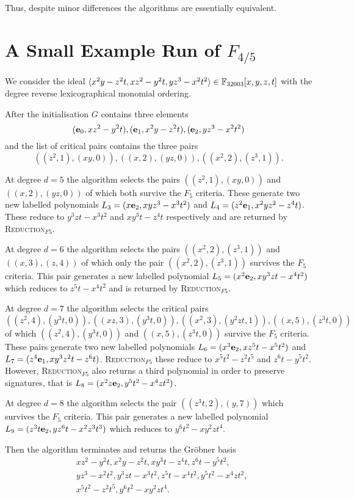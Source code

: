 Thus, despite minor differences the algorithms are essentially equivalent.

\section{A Small Example Run of \texorpdfstring{$F_{4/5}$}{F45}}

We consider the ideal $\langle {x^{2} y - z^{2} t, x z^{2} - y^{2} t, y z^{3} - x^{2} t^{2}} \rangle \in \mathbb{F}_{32003}[x, y, z, t]$ with the degree reverse lexicographical monomial ordering.

After the initialisation $G$ contains three elements $$(\mathbf{e}_0, xz^2 - y^2t), (\mathbf{e}_1, x^2y - z^2t),(\mathbf{e}_2, yz^3 - x^2t^2)$$ and the list of critical pairs contains the three pairs $$((z^2, 1), (xy, 0)), ((x, 2), (yz, 0)), ((x^2, 2), (z^3, 1)).$$

At degree $d=5$ the algorithm selects the pairs $((z^2, 1), (xy, 0))$ and $((x, 2), (yz, 0))$ of which both survive the $F_5$ criteria. These generate two new labelled polynomials $L_3 = (x\mathbf{e}_2, xyz^3 - x^3t^2)$ and $L_4 =(z^2\mathbf{e}_1, x^2yz^2 - z^4t)$. These reduce to $y^3zt - x^3t^2$ and $xy^3t - z^4t$ respectively and are returned by \textsc{Reduction}$_{F5}$.

At degree $d=6$ the algorithm selects the pairs $((x^2, 2), (z^3, 1))$ and $((x, 3), (z, 4))$ of which only the pair $((x^2, 2), (z^3, 1))$ survives the $F_5$ criteria. This pair generates a new labelled polynomial $L_5 = (x^2\mathbf{e}_2,xy^3zt - x^4t^2)$ which reduces to $z^5t - x^4t^2$ and is returned by  \textsc{Reduction}$_{F5}$.

At degree $d=7$ the algorithm selects the critical pairs $$((z^2, 4), (y^3t, 0)), ((xz, 3), (y^3t, 0)), ((x^2, 3), (y^2zt, 1)), ((x, 5), (z^3t, 0))$$ of which $((z^2, 4), (y^3t, 0))$ and $((x, 5), (z^3t, 0))$ survive the $F_5$ criteria. These pairs generate two new labelled polynomials $L_6 = (x^3\mathbf{e}_2, xz^5t - x^5t^2)$ and $L_7 = (z^4\mathbf{e}_1, xy^3z^2t - z^6t)$. \textsc{Reduction}$_{F5}$ these reduce to $x^5t^2 - z^2t^5$ and $z^6t - y^5t^2$. However, \textsc{Reduction}$_{F5}$ also returns a third polynomial in order to preserve signatures, that is $L_8 = (x^2z\mathbf{e}_2, y^5t^2 - x^4zt^2)$.

At degree $d=8$ the algorithm selects the pair $((z^3t, 2), (y, 7))$ which survives the $F_5$ criteria. This pair generates a new labelled polynomial $L_9 = 
(z^3t\mathbf{e}_2, yz^6t - x^2z^3t^3)$ which reduces to $y^6t^2 - xy^2zt^4$.

Then the algorithm terminates and returns the Gröbner basis
\begin{align*}
& x z^{2} - y^{2} t, x^{2} y - z^{2} t,  x y^{3} t - z^{4} t, z^{6} t - y^{5} t^{2}, \\
& y z^{3} - x^{2} t^{2}, y^{3} z t - x^{3} t^{2},  z^{5} t - x^{4} t^{2}, y^{5} t^{2} - x^{4} z t^{2}, \\
& x^{5} t^{2} - z^{2} t^{5}, y^{6} t^{2} - x y^{2} z t^{4}.
\end{align*}
